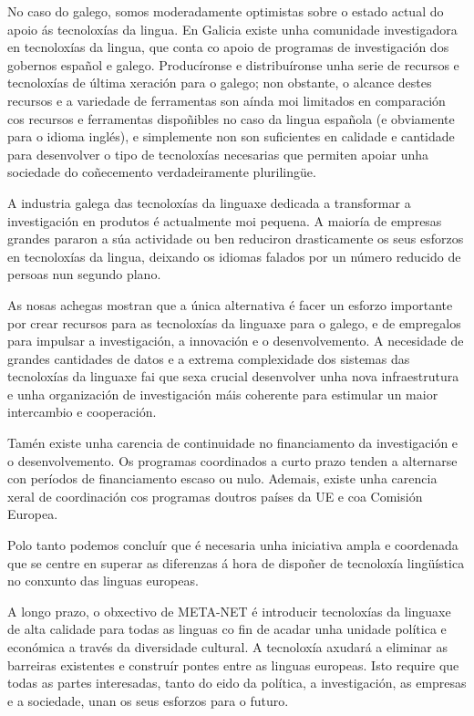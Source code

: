 \begin{multicols}{2}
\begin{itemize}
\begin{multicols}{2}
No caso do galego, somos moderadamente optimistas sobre o estado actual do apoio ás tecnoloxías da lingua. En Galicia existe unha comunidade investigadora en tecnoloxías da lingua, que conta co apoio de programas de investigación dos gobernos español e galego. Producíronse e distribuíronse unha serie de recursos e tecnoloxías de última xeración para o galego; non obstante, o alcance destes recursos e a variedade de ferramentas son aínda moi limitados en comparación cos recursos e ferramentas dispoñibles no caso da lingua española (e obviamente para o idioma inglés), e simplemente non son suficientes en calidade e cantidade para desenvolver o tipo de tecnoloxías necesarias que permiten apoiar unha sociedade do coñecemento verdadeiramente plurilingüe.

A industria galega das tecnoloxías da linguaxe dedicada a transformar a investigación en produtos é actualmente moi pequena. A maioría de empresas grandes pararon a súa actividade ou ben reduciron drasticamente os seus esforzos en tecnoloxías da lingua, deixando os idiomas falados por un número reducido de persoas nun segundo plano.

As nosas achegas mostran que a única alternativa é facer un esforzo importante por crear recursos para as tecnoloxías da linguaxe para o galego, e de empregalos para impulsar a investigación, a innovación e o desenvolvemento. A necesidade de grandes cantidades de datos e a extrema complexidade dos sistemas das tecnoloxías da linguaxe fai que sexa crucial desenvolver unha nova infraestrutura e unha organización de investigación máis coherente para estimular un maior intercambio e cooperación.

Tamén existe unha carencia de continuidade no financiamento da investigación e o desenvolvemento. Os programas coordinados a curto prazo tenden a alternarse con períodos de financiamento escaso ou nulo. Ademais, existe unha carencia xeral de coordinación cos programas doutros países da UE e coa Comisión Europea.

Polo tanto podemos concluír que é necesaria unha iniciativa ampla e coordenada que se centre en superar as diferenzas á hora de dispoñer de tecnoloxía lingüística no conxunto das linguas europeas.

A longo prazo, o obxectivo de META-NET é introducir tecnoloxías da linguaxe de alta calidade para todas as linguas co fin de acadar unha unidade política e económica a través da diversidade cultural. A tecnoloxía axudará a eliminar as barreiras existentes e construír pontes entre as linguas europeas. Isto require que todas as partes interesadas, tanto do eido da política, a investigación, as empresas e a sociedade, unan os seus esforzos para o futuro.




\end{multicols}
\end{itemize}
\end{multicols}

